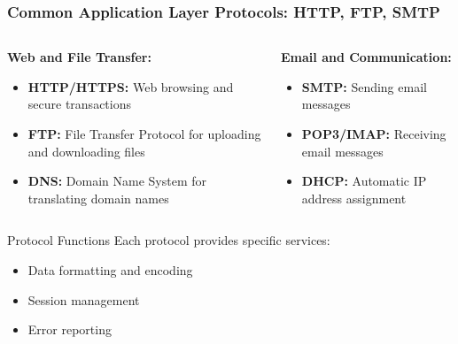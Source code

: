 \documentclass{beamer}
\begin{document}
\begin{frame}
    \frametitle{Common Application Layer Protocols: HTTP, FTP, SMTP}
    
    \begin{columns}[t]
        \begin{column}{0.5\textwidth}
            \textbf{Web and File Transfer:}
            \begin{itemize}
                \item \textbf{HTTP/HTTPS:} Web browsing and secure transactions
                \item \textbf{FTP:} File Transfer Protocol for uploading and downloading files 
                \item \textbf{DNS:} Domain Name System for translating domain names
            \end{itemize}
        \end{column}
        
        \begin{column}{0.5\textwidth}
            \textbf{Email and Communication:}
            \begin{itemize}
                \item \textbf{SMTP:} Sending email messages
                \item \textbf{POP3/IMAP:} Receiving email messages
                \item \textbf{DHCP:} Automatic IP address assignment
            \end{itemize}
        \end{column}
    \end{columns}
    
    \begin{block}{Protocol Functions}
        Each protocol provides specific services:
        \begin{itemize}
            \item Data formatting and encoding
            \item Session management
            \item Error reporting
        \end{itemize}
    \end{block}
\end{frame}
\end{document}
